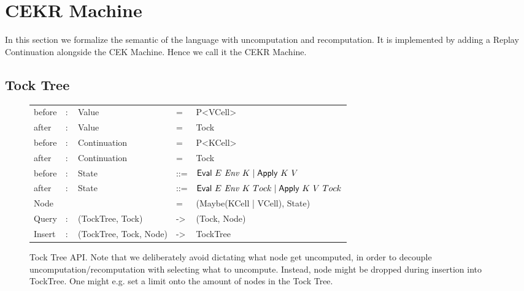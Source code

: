 \section{CEKR Machine}
In this section we formalize the semantic of the language with uncomputation and recomputation. It is implemented by adding a Replay Continuation alongside the CEK Machine.
Hence we call it the CEKR Machine.

\subsection{Tock Tree}
\begin{figure}
	\begin{tabular}{p{4em} p{2.6em} p{10em} p{1em} p{}}
	before & $:$ & Value & = & P<VCell> \\
	after & $:$ & Value & = & Tock \\
	before & $:$ & Continuation & = & P<KCell> \\
	after & $:$ & Continuation & = & Tock \\
	before & $:$ & State & ::= & $\text{\textsf{Eval}}~E~\mathit{Env}~K \mid \text{\textsf{Apply}}~K~V $ \\
	after & $:$ & State & ::= & $\text{\textsf{Eval}}~E~\mathit{Env}~K~Tock \mid \text{\textsf{Apply}}~K~V~Tock $ \\
	Node & & & = & (Maybe(KCell | VCell), State) \\
	Query & $:$ & (TockTree, Tock) & -> & (Tock, Node) \\
	Insert & $:$ & (TockTree, Tock, Node) & -> & TockTree \\
	\end{tabular}
	\caption{Tock Tree API. Note that we deliberately avoid dictating what node get uncomputed, in order to decouple uncomputation/recomputation with selecting what to uncompute. Instead, node might be dropped during insertion into TockTree. One might e.g. set a limit onto the amount of nodes in the Tock Tree. }
\end{figure}

